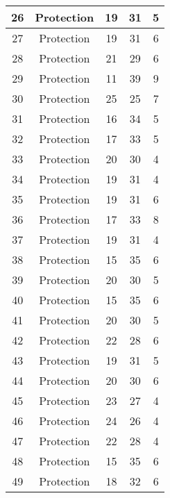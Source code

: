 \documentclass[results.tex]{subfiles}
\begin{document}
\begin{center}
\begin{tabular}{| c || c | c | c | c |}
    \hline
    26 & Protection & 19 & 31 & 5 \\ 
    \hline
    27 & Protection & 19 & 31 & 6 \\ 
    \hline
    28 & Protection & 21 & 29 & 6 \\ 
    \hline
    29 & Protection & 11 & 39 & 9 \\ 
    \hline
    30 & Protection & 25 & 25 & 7 \\ 
    \hline
    31 & Protection & 16 & 34 & 5 \\ 
    \hline
    32 & Protection & 17 & 33 & 5 \\ 
    \hline
    33 & Protection & 20 & 30 & 4 \\ 
    \hline
    34 & Protection & 19 & 31 & 4 \\ 
    \hline
    35 & Protection & 19 & 31 & 6 \\ 
    \hline
    36 & Protection & 17 & 33 & 8 \\ 
    \hline
    37 & Protection & 19 & 31 & 4 \\ 
    \hline
    38 & Protection & 15 & 35 & 6 \\ 
    \hline
    39 & Protection & 20 & 30 & 5 \\ 
    \hline
    40 & Protection & 15 & 35 & 6 \\ 
    \hline
    41 & Protection & 20 & 30 & 5 \\ 
    \hline
    42 & Protection & 22 & 28 & 6 \\ 
    \hline
    43 & Protection & 19 & 31 & 5 \\ 
    \hline
    44 & Protection & 20 & 30 & 6 \\ 
    \hline
    45 & Protection & 23 & 27 & 4 \\ 
    \hline
    46 & Protection & 24 & 26 & 4 \\ 
    \hline
    47 & Protection & 22 & 28 & 4 \\ 
    \hline
    48 & Protection & 15 & 35 & 6 \\ 
    \hline
    49 & Protection & 18 & 32 & 6 \\ 
    \hline   \end{tabular}
\end{center}
\end{document}
